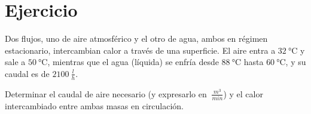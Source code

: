 \section{Ejercicio}\label{ej:Chap04Ejercicio07}

Dos flujos, uno de aire atmosférico y el otro de agua, ambos en régimen estacionario, intercambian calor a través de una superficie. El aire entra a $\SI{32}{\celsius}$ y sale a $\SI{50}{\celsius}$, mientras que el agua (líquida) se enfría desde $\SI{88}{\celsius}$ hasta $\SI{60}{\celsius}$, y su caudal es de $\SI{2100}{\frac{l}{h}}$.

Determinar el caudal de aire necesario (y expresarlo en $\SI{}{\frac{m^3}{min}}$) y el calor intercambiado entre ambas masas en circulación.